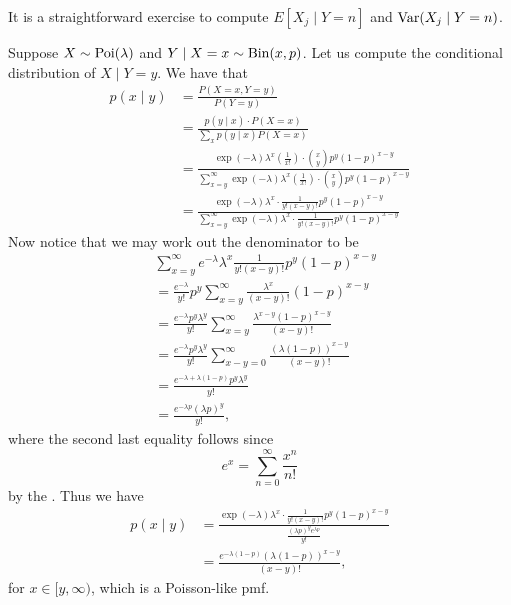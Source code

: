 \documentclass[notoc,notitlepage]{tufte-book}
\begin{document}
\begin{ex}
  It is a straightforward exercise to compute $E[X_j \mid Y = n]$ and $\operatorname{Var}(X_j
  \mid Y = n)$.
\end{ex}

\begin{eg}
  Suppose $X \sim \operatorname{Poi}(\lambda)$ and $Y \mid X = x \sim \operatorname{Bin}(x, p)$. Let us
  compute the conditional distribution of $X \mid Y = y$. We have that
  \begin{align*}
    p(x \mid y)
    &= \frac{P(X = x, Y = y)}{P(Y = y)} \\
    &= \frac{p(y \mid x) \cdot P(X = x)}{\sum_{x} p(y \mid x) P(X = x)} \\
    &= \frac{\exp(-\lambda) \lambda^x \left( \frac{1}{x!} \right) \cdot
        \binom{x}{y} p^y (1-p)^{x-y}}{\sum\limits_{x = y}^{\infty}
        \exp(-\lambda)\lambda^x \left( \frac{1}{x!} \right) \cdot \binom{x}{y}
        p^y (1-p)^{x-y}} \\
    &= \frac{\exp(-\lambda) \lambda^x \cdot \frac{1}{y!(x-y)!} p^y
        (1-p)^{x-y}}{\sum\limits_{x = y}^{\infty} \exp(-\lambda)\lambda^x \cdot
        \frac{1}{y!(x-y)!} p^y (1-p)^{x-y}}
  \end{align*}
  Now notice that we may work out the denominator to be
  \begin{align*}
    & \sum_{x=y}^{\infty} e^{-\lambda} \lambda^x \frac{1}{y!(x-y)!}p^y
      (1-p)^{x-y} \\
    &= \frac{e^{-\lambda}}{y!} p^y \sum_{x=y}^{\infty} \frac{\lambda^x}{(x-y)!}
      (1-p)^{x-y} \\
    &= \frac{e^{-\lambda} p^y \lambda^y}{y!} \sum_{x=y}^{\infty}
      \frac{\lambda^{x-y}(1-p)^{x-y}}{(x-y)!} \\
    &= \frac{e^{-\lambda} p^y \lambda^y}{y!} \sum_{x-y=0}^{\infty}
      \frac{(\lambda(1-p))^{x-y}}{(x-y)!} \\
    &= \frac{e^{-\lambda + \lambda(1 - p)} p^y \lambda^y}{y!} \\
    &= \frac{e^{-\lambda p} (\lambda p)^y}{y!},
  \end{align*}
  where the second last equality follows since
  \begin{equation*}
    e^x = \sum_{n=0}^{\infty} \frac{x^n}{n!}
  \end{equation*}
  by the . Thus we have
  \begin{align*}
    p(x \mid y)
    &= \frac{\exp(-\lambda) \lambda^x \cdot \frac{1}{y!(x-y)!} p^y
      (1-p)^{x-y}}{\frac{(\lambda p)^y e^{\lambda p}}{y!}} \\
    &= \frac{e^{-\lambda(1 - p)}(\lambda(1-p))^{x-y}}{(x-y)!},
  \end{align*}
  for $x \in [y, \infty)$, which is a Poisson-like pmf.


\end{eg}
\end{document}
